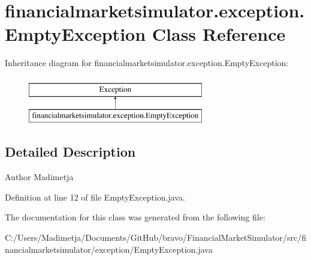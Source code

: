 \hypertarget{classfinancialmarketsimulator_1_1exception_1_1_empty_exception}{\section{financialmarketsimulator.\+exception.\+Empty\+Exception Class Reference}
\label{classfinancialmarketsimulator_1_1exception_1_1_empty_exception}
}
Inheritance diagram for financialmarketsimulator.\+exception.\+Empty\+Exception\+:\begin{figure}[H]
\begin{center}
\leavevmode
\includegraphics[height=2.000000cm]{classfinancialmarketsimulator_1_1exception_1_1_empty_exception}
\end{center}
\end{figure}


\subsection{Detailed Description}
\begin{DoxyAuthor}{Author}
Madimetja 
\end{DoxyAuthor}


Definition at line 12 of file Empty\+Exception.\+java.



The documentation for this class was generated from the following file\+:\begin{DoxyCompactItemize}
\item 
C\+:/\+Users/\+Madimetja/\+Documents/\+Git\+Hub/bravo/\+Financial\+Market\+Simulator/src/financialmarketsimulator/exception/Empty\+Exception.\+java\end{DoxyCompactItemize}
